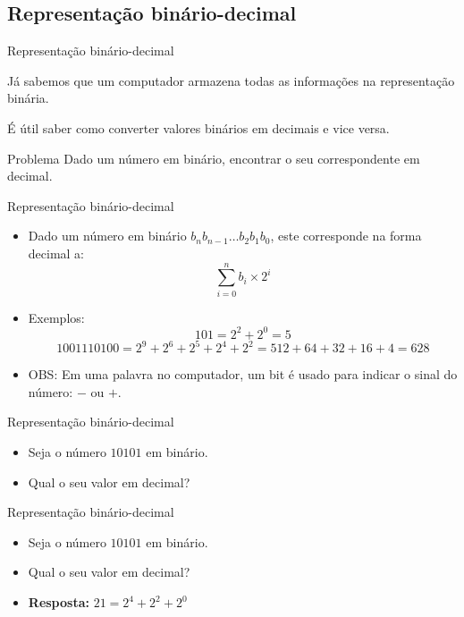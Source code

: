 \documentclass[handout]{beamer}
\begin{document}
\subsection{Representação binário-decimal}%

\begin{frame}[fragile]{Representação binário-decimal}
        
    Já sabemos que um computador armazena todas as informações na representação binária.

    É útil saber como converter valores binários em decimais e vice versa.

    \begin{block}{Problema}
        Dado um número em binário, encontrar o seu correspondente em decimal.
    \end{block}
\end{frame}
    
\begin{frame}[fragile]{Representação binário-decimal}
    
    \begin{itemize}
        \item Dado um número em binário $b_nb_{n-1}\ldots b_2b_1b_0$, este corresponde na forma decimal a:
            $$\sum_{i=0}^n b_i \times 2^i $$
        \item Exemplos:
            $$101 = 2^2 + 2^0 = 5 $$
            $$1001110100 = 2^{9} + 2^6 + 2^5 + 2^4 + 2^2 = 512+64+32+16+4=628$$
        \item OBS: Em uma palavra no computador, um bit é usado para indicar o sinal do número: $-$ ou $+$.
    \end{itemize}   
\end{frame}

\begin{frame}[fragile]{Representação binário-decimal}
    
    \begin{itemize}
        \item Seja o número $10101$ em binário.
        \item Qual o seu valor em decimal?
    \end{itemize}
\end{frame}

\begin{frame}[fragile]{Representação binário-decimal}

    \begin{itemize}
        \item Seja o número $10101$ em binário.
        \item Qual o seu valor em decimal?
        \item {\bf Resposta:} $21 = 2^4 + 2^2 + 2^0$
    \end{itemize}
\end{frame}
\end{document}
